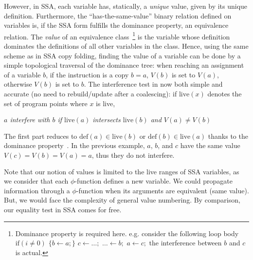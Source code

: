 However, in SSA, each variable has, statically, a \emph{unique} value, given by its unique
definition.  Furthermore, the ``has-the-same-value'' binary relation defined on
variables is, if the SSA form fulfills the dominance property, an equivalence relation.  
The \emph{value} of an equivalence class~\footnote{Dominance property is required here. e.g. consider the following loop body $\textrm{if}(i\neq 0)$ $\{b\gets a;\}$ $c\gets\dots;$ $\dots\gets b;$ $a\gets c;$ the interference between $b$ and $c$ is actual.} 
is the variable whose definition
dominates the definitions of all other variables in the class.
Hence, using the same scheme as in SSA copy folding, finding the value of a
variable can be done by a simple topological traversal of the dominance tree:
when reaching an assignment of a variable $b$, if the instruction is a copy
$b=a$, $V(b)$ is set to $V(a)$, otherwise $V(b)$ is set to $b$. The
interference test in now both simple and accurate (no need to rebuild/update
after a coalescing): if $\textrm{live}(x)$ denotes the set of program points
where $x$ is live, 

\centerline{\emph{$a$ interfere with $b$ if $\textrm{live}(a)$ intersects
  $\textrm{live}(b)$ and $V(a)\neq V(b)$}}

  The first part reduces to
$\textrm{def}(a)\in \textrm{live}(b)$ or $\textrm{def}(b)\in \textrm{live}(a)$
thanks to the dominance property\ifhab~\cite{liverange.pldi02}\fi. In the previous
example, $a$, $b$, and $c$ have the same value $V(c)=V(b)=V(a)=a$, thus they do
not interfere.

Note that our notion of values is limited to the live ranges of SSA
variables, as we consider that each $\phi$-function defines a new variable. We
could propagate information through a $\phi$-function when its arguments are
equivalent (same value). But, we would face the complexity of general value
numbering. By comparison, our equality test in SSA comes for free.

